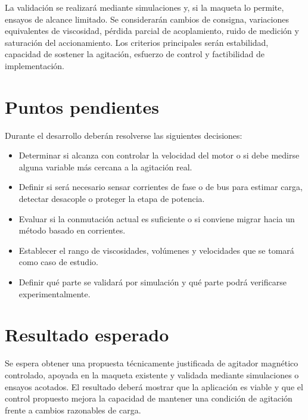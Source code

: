 \documentclass[12pt,a4paper]{article}
\begin{document}
La validación se realizará mediante simulaciones y, si la maqueta lo permite, ensayos de alcance limitado. Se considerarán cambios de consigna, variaciones equivalentes de viscosidad, pérdida parcial de acoplamiento, ruido de medición y saturación del accionamiento. Los criterios principales serán estabilidad, capacidad de sostener la agitación, esfuerzo de control y factibilidad de implementación.

\section{Puntos pendientes}

Durante el desarrollo deberán resolverse las siguientes decisiones:

\begin{itemize}
    \item Determinar si alcanza con controlar la velocidad del motor o si debe medirse alguna variable más cercana a la agitación real.
    \item Definir si será necesario sensar corrientes de fase o de bus para estimar carga, detectar desacople o proteger la etapa de potencia.
    \item Evaluar si la conmutación actual es suficiente o si conviene migrar hacia un método basado en corrientes.
    \item Establecer el rango de viscosidades, volúmenes y velocidades que se tomará como caso de estudio.
    \item Definir qué parte se validará por simulación y qué parte podrá verificarse experimentalmente.
\end{itemize}

\section{Resultado esperado}

Se espera obtener una propuesta técnicamente justificada de agitador magnético controlado, apoyada en la maqueta existente y validada mediante simulaciones o ensayos acotados. El resultado deberá mostrar que la aplicación es viable y que el control propuesto mejora la capacidad de mantener una condición de agitación frente a cambios razonables de carga.
\end{document}
